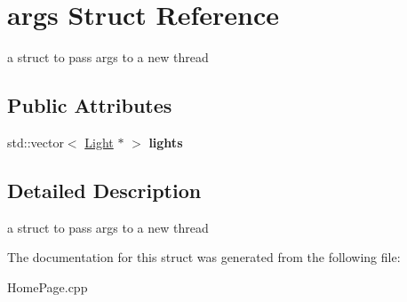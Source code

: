\hypertarget{structargs}{}\section{args Struct Reference}
\label{structargs}


a struct to pass args to a new thread  


\subsection*{Public Attributes}
\begin{DoxyCompactItemize}
\item 
\mbox{\label{structargs_a774aa150d235307ae9383d456c89efac}} 
std\+::vector$<$ \hyperlink{class_light}{Light} $\ast$ $>$ {\bfseries lights}
\end{DoxyCompactItemize}


\subsection{Detailed Description}
a struct to pass args to a new thread 

The documentation for this struct was generated from the following file\+:\begin{DoxyCompactItemize}
\item 
Home\+Page.\+cpp\end{DoxyCompactItemize}
